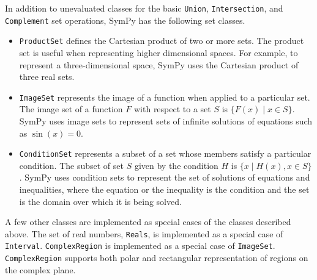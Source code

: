
In addition to unevaluated classes for the basic \texttt{Union},
\texttt{Intersection}, and \texttt{Complement} set operations, SymPy has the
following set classes.

\begin{itemize}

    \item \verb|ProductSet| defines the Cartesian product of two
        or more sets. The product set is useful when representing higher
        dimensional spaces. For example, to represent a three-dimensional space,
        SymPy uses the Cartesian product of three real sets.

      \item \verb|ImageSet| represents the image of a function when applied to
        a particular set. The image set of a function $F$ with respect to a set
        $S$ is $\{ F(x) \mid x \in S \}$. SymPy uses image sets to represent sets
        of infinite solutions of equations such as $\sin(x)=0$.


      \item \verb|ConditionSet| represents a subset of a set whose members
        satisfy a particular condition. The subset of set $S$
        given by the condition $H$ is $\{x \mid H(x), x \in S \}$. SymPy uses
        condition sets to represent the set of solutions of equations and
        inequalities, where the equation or the inequality is the condition and
        the set is the domain over which it is being solved.

\end{itemize}

A few other classes are implemented as special cases of the classes described
above. The set of real numbers, \verb|Reals|, is implemented as a special case
of \verb|Interval|. \verb|ComplexRegion|
is implemented as a special case of \verb|ImageSet|. \verb|ComplexRegion|
supports both polar and rectangular representation of regions on the complex
plane.
